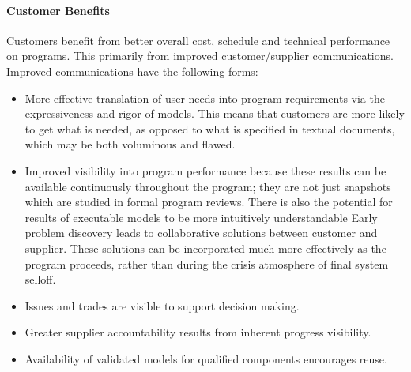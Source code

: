 \documentclass[a4paper,12pt,twoside]{report}
\begin{document}
{			\paragraph{Customer Benefits} {Customers benefit from better overall cost, schedule and technical performance on  programs. This primarily from improved customer/supplier communications. Improved communications have the following forms: \cite{FoundationalConceptsMDSD}
			}
			\begin{itemize}
				\item More effective translation of user needs into program requirements via the expressiveness and rigor of models. This means that customers are more likely to get what is needed, as opposed to what is specified in textual documents, which may be both voluminous and flawed.
				\item Improved visibility into program performance because these results can be available continuously throughout the program; they are not just snapshots which are studied in formal program reviews. There is also the potential for results of executable models to be more intuitively understandable Early problem discovery leads to collaborative solutions between customer and supplier. These solutions can be incorporated much more effectively as the program proceeds, rather than during the crisis atmosphere of final system selloff.
				\item Issues and trades are visible to support decision making.
				\item Greater supplier accountability results from inherent progress visibility.
				\item Availability of validated models for qualified components encourages reuse.
			\end{itemize}
			
}
\end{document}
